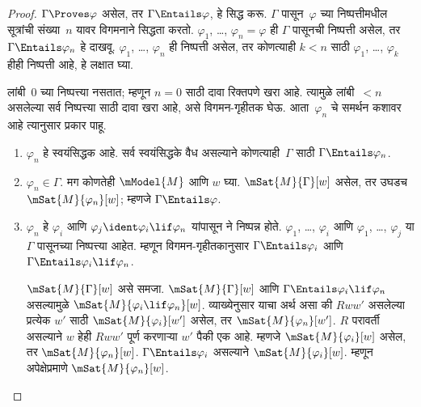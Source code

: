 \begin{proof}
  $\Gamma \Proves \varphi$ असेल, तर
  $\Gamma \Entails \varphi$, हे सिद्ध करू.
  $\Gamma$ पासून~$\varphi$ च्या
  निष्पत्तीमधील सूत्रांची
  संख्या~$n$ यावर विगमनाने सिद्धता करतो.
  $\varphi_1$, \dots, $\varphi_n = \varphi$ ही
  $\Gamma$ पासूनची निष्पत्ती असेल,
  तर $\Gamma \Entails \varphi_n$ हे दाखवू.
  $\varphi_1$, \dots, $\varphi_n$ ही
  निष्पत्ती असेल, तर कोणत्याही $k<n$
  साठी $\varphi_1$, \dots, $\varphi_k$ हीही
  निष्पत्ती आहे, हे लक्षात घ्या.

  लांबी~$0$ च्या निष्पत्त्या नसतात; म्हणून
  $n=0$ साठी दावा रिक्तपणे खरा आहे.
  त्यामुळे लांबी~$<n$ असलेल्या सर्व
  निष्पत्त्या साठी दावा खरा आहे, असे
  विगमन-गृहीतक घेऊ. आता~$\varphi_n$ चे
  समर्थन कशावर आहे त्यानुसार प्रकार पाहू.

  \begin{enumerate}
  \item $\varphi_n$ हे स्वयंसिद्धक आहे.
    सर्व स्वयंसिद्धके वैध असल्याने कोणत्याही~$\Gamma$
    साठी $\Gamma \Entails
    \varphi_n$.
  \item $\varphi_n \in \Gamma$. मग कोणतेही
    $\mModel{M}$ आणि $w$ घ्या.
    $\mSat{M}{\Gamma}[w]$ असेल, तर उघडच
    $\mSat{M}{\varphi_n}[w]$; म्हणजे
    $\Gamma \Entails \varphi$.
  \item $\varphi_n$ हे $\varphi_i$ आणि
    $\varphi_j \ident \varphi_i \lif
    \varphi_n$ यांपासून \MP{} ने निष्पन्न होते.
    $\varphi_1$, \dots, $\varphi_i$ आणि
    $\varphi_1$, \dots, $\varphi_j$ या
    $\Gamma$ पासूनच्या निष्पत्त्या आहेत.
    म्हणून विगमन-गृहीतकानुसार
    $\Gamma \Entails \varphi_i$ आणि
    $\Gamma \Entails \varphi_i \lif \varphi_n$.

    $\mSat{M}{\Gamma}[w]$ असे समजा.
    $\mSat{M}{\Gamma}[w]$ आणि
    $\Gamma \Entails \varphi_i \lif \varphi_n$
    असल्यामुळे $\mSat{M}{\varphi_i \lif
      \varphi_n}[w]$. व्याख्येनुसार याचा अर्थ
    असा की $Rww'$ असलेल्या प्रत्येक $w'$
    साठी $\mSat{M}{\varphi_i}[w']$ असेल, तर
    $\mSat{M}{\varphi_n}[w']$. $R$ परावर्ती
    असल्याने $w$ हेही $Rww'$ पूर्ण करणाऱ्या
    $w'$ पैकी एक आहे. म्हणजे
    $\mSat{M}{\varphi_i}[w]$ असेल, तर
    $\mSat{M}{\varphi_n}[w]$.
    $\Gamma \Entails \varphi_i$ असल्याने
    $\mSat{M}{\varphi_i}[w]$. म्हणून
    अपेक्षेप्रमाणे $\mSat{M}{\varphi_n}[w]$.
  \end{enumerate}
\end{proof}












